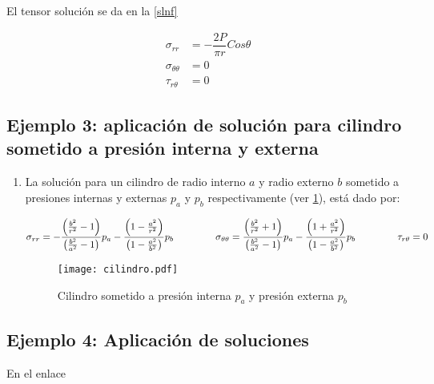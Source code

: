 \documentclass[../notas medios.tex]{subfiles}
\begin{document}
El tensor solución se da en la \cref{slnf}

\begin{equation}
\begin{split}
{ \sigma_{rr}} & = -\dfrac{2P}{\pi r} Cos \theta \\
{\sigma_{\theta\theta}}  &= 0\\
{\tau_{r\theta}}&= 0
\end{split}
\label{slnf}
\end{equation}

\subsection*{Ejemplo 3: aplicación de solución para cilindro sometido a presión interna y externa}

\begin{enumerate} 

\item La solución para un cilindro de radio interno $a$ y radio externo $b$ sometido a presiones internas y externas $p_a$ y $p_b$ respectivamente (ver \cref{cilindro}), está dado por:

\begin{equation*}
\sigma _{rr}  =  - \frac{{\left( {\frac{{{b^2}}}{{{r^2}}} - 1} \right)}}{{\left( {\frac{{{b^2}}}{{{a^2}}} - 1} \right)}}{p_a} - \frac{{\left( {1 - \frac{{{a^2}}}{{{r^2}}}} \right)}}{{\left( {1 - \frac{{{a^2}}}{{{b^2}}}} \right)}}{p_b} \hspace{1.5cm}
\sigma _{\theta \theta } = \frac{{\left( {\frac{{{b^2}}}{{{r^2}}} + 1} \right)}}{{\left( {\frac{{{b^2}}}{{{a^2}}} - 1} \right)}}{p_a} - \frac{{\left( {1 + \frac{{{a^2}}}{{{r^2}}}} \right)}}{{\left( {1 - \frac{{{a^2}}}{{{b^2}}}} \right)}}{p_b} \hspace{1.5cm}
\tau _{r\theta} = 0
\label{slnc}
\end{equation*}

\begin{figure}[H]
\centering
	\texttt{[image: cilindro.pdf]}
	\caption{Cilindro sometido a presión interna $p_a$ y presión externa $p_b$}
	\label{cilindro}
\end{figure}

\end{enumerate}

\subsection*{Ejemplo 4: Aplicación de soluciones}
En el enlace
\end{document}
